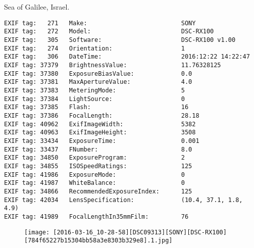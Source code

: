 \section{\protect{}}
\noindent Sea of Galilee, Israel.
\noindent
\begin{lstlisting}
EXIF tag:   271   Make:                          SONY
EXIF tag:   272   Model:                         DSC-RX100
EXIF tag:   305   Software:                      DSC-RX100 v1.00
EXIF tag:   274   Orientation:                   1
EXIF tag:   306   DateTime:                      2016:12:22 14:22:47
EXIF tag: 37379   BrightnessValue:               11.76328125
EXIF tag: 37380   ExposureBiasValue:             0.0
EXIF tag: 37381   MaxApertureValue:              4.0
EXIF tag: 37383   MeteringMode:                  5
EXIF tag: 37384   LightSource:                   0
EXIF tag: 37385   Flash:                         16
EXIF tag: 37386   FocalLength:                   28.18
EXIF tag: 40962   ExifImageWidth:                5382
EXIF tag: 40963   ExifImageHeight:               3508
EXIF tag: 33434   ExposureTime:                  0.001
EXIF tag: 33437   FNumber:                       8.0
EXIF tag: 34850   ExposureProgram:               2
EXIF tag: 34855   ISOSpeedRatings:               125
EXIF tag: 41986   ExposureMode:                  0
EXIF tag: 41987   WhiteBalance:                  0
EXIF tag: 34866   RecommendedExposureIndex:      125
EXIF tag: 42034   LensSpecification:             (10.4, 37.1, 1.8, 4.9)
EXIF tag: 41989   FocalLengthIn35mmFilm:         76

\end{lstlisting}
\clearpage
\begin{figure}
\raggedleft
\texttt{[image: [2016-03-16\_10-28-58][DSC09313][SONY][DSC-RX100][784f65227b15304bb58a3e8303b329e8].1.jpg]}
\end{figure}


\clearpage
